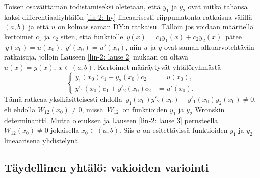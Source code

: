 Toisen osaväittämän todistamiseksi oletetaan, että $y_1$ ja $y_2$ ovat mitkä tahansa kaksi 
differentiaaliyhtälön \eqref{lin-2: hy} lineaarisesti riippumatonta ratkaisua välillä $(a,b)$
ja että $u$ on kolmas saman DY:n ratkaisu. Tällöin jos voidaan määritellä kertoimet $c_1$ ja 
$c_2$ siten, että funktiolle $\,y(x)=c_1y_1(x)+c_2y_2(x)\,$ pätee 
$\,y(x_0)=u(x_0),\ y'(x_0)=u'(x_0)$, niin $u$ ja $y$ ovat saman alkuarvotehtävän ratkaisuja,
jolloin Lauseen \ref{lin-2: lause 2} mukaan on oltava $u(x)=y(x),\ x\in(a,b)$. Kertoimet
määräytyvät yhtälöryhmästä
\[ \left\{ \begin{aligned}
y_1(x_0)c_1+y_2(x_0)c_2 &= u(x_0), \\ y'_1(x_0)c_1+y'_2(x_0)c_2 &= u'(x_0).
           \end{aligned} \right. \]
Tämä ratkeaa yksikäsitteisesti ehdolla $\,y_1(x_0)y'_2(x_0)-y'_1(x_0)y_2(x_0) \neq 0$, eli
ehdolla $W_{12}(x_0) \neq 0$, missä $\,W_{12}\,$ on funktioiden $y_1$ ja $y_2$ Wronskin
determinantti. Mutta oletuksen ja Lauseen \ref{lin-2: lause 3} perusteella
$W_{12}(x_0) \neq 0$ jokaisella $x_0\in(a,b)$. Siis $u$ on esitettävissä funktioiden $y_1$ ja
$y_2$ lineaarisena yhdistelynä. \loppu

\subsection{Täydellinen yhtälö: vakioiden variointi}


